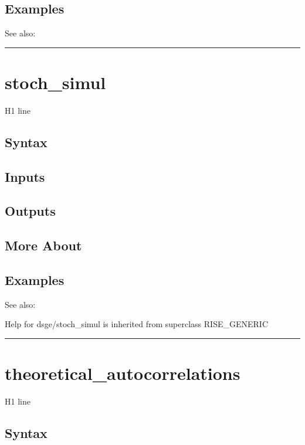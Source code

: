 \documentclass[letterpaper,10pt,english]{sphinxmanual}
\begin{document}
\subsection{Examples}
\label{classes/models/@dsge/dsge:id199}
See also:


\bigskip\hrule{}\bigskip



\section{stoch\_simul}
\label{classes/models/@dsge/dsge:id200}\label{classes/models/@dsge/dsge:stoch-simul}
H1 line


\subsection{Syntax}
\label{classes/models/@dsge/dsge:id201}

\subsection{Inputs}
\label{classes/models/@dsge/dsge:id202}

\subsection{Outputs}
\label{classes/models/@dsge/dsge:id203}

\subsection{More About}
\label{classes/models/@dsge/dsge:id204}

\subsection{Examples}
\label{classes/models/@dsge/dsge:id205}
See also:

Help for dsge/stoch\_simul is inherited from superclass RISE\_GENERIC


\bigskip\hrule{}\bigskip



\section{theoretical\_autocorrelations}
\label{classes/models/@dsge/dsge:theoretical-autocorrelations}\label{classes/models/@dsge/dsge:id206}
H1 line


\subsection{Syntax}
\label{classes/models/@dsge/dsge:id207}
\end{document}
